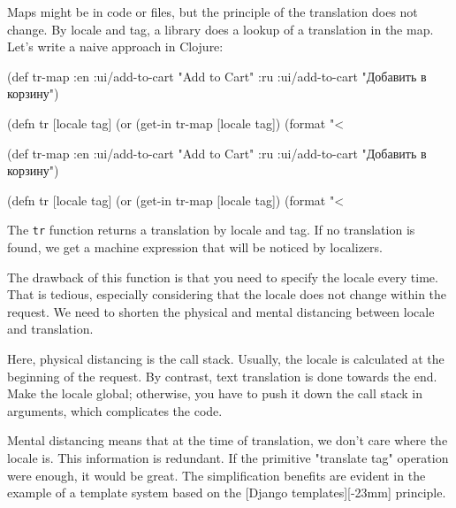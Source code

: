 Maps might be in code or files, but the principle of the translation does not change. By locale and tag, a library does a lookup of a translation in the map.
Let's write a naive approach in Clojure:

\ifx\DEVICETYPE\MOBILE

  \begin{clojure}
(def tr-map
  {:en {:ui/add-to-cart "Add to Cart"}
   :ru {:ui/add-to-cart
        "Добавить в корзину"}})

(defn tr [locale tag]
  (or (get-in tr-map [locale tag])
      (format "<%
  \end{clojure}

\else

  \begin{clojure}
(def tr-map
  {:en {:ui/add-to-cart "Add to Cart"}
   :ru {:ui/add-to-cart "Добавить в корзину"}})

(defn tr [locale tag]
  (or (get-in tr-map [locale tag])
      (format "<%
  \end{clojure}

\fi


The \verb|tr| function returns a translation by locale and tag. If no translation is found, we get a machine expression that will be noticed by localizers.

The drawback of this function is that you need to specify the locale every time.
That is tedious, especially considering that the locale does not change within the request.
We need to shorten the physical and mental distancing between locale and translation.


Here, physical distancing is the call stack.
Usually, the locale is calculated at the beginning of the request. By contrast, text translation is done towards the end.
Make the locale global; otherwise, you have to push it down the call stack in arguments, which complicates the code.


Mental distancing means that at the time of translation, we don't care where the locale is.
This information is redundant.
If the primitive "translate tag" operation were enough, it would be great. The simplification benefits are evident in the example of a template system based on the [Django templates][-23mm] principle.


